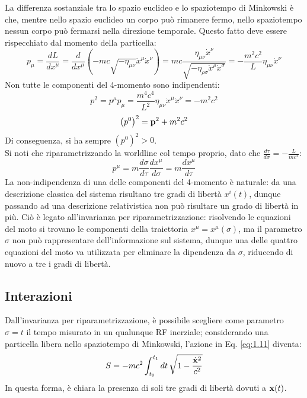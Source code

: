 La differenza sostanziale tra lo spazio euclideo e lo spaziotempo di Minkowski è che, mentre nello spazio euclideo un corpo può rimanere fermo, nello spaziotempo nessun corpo può fermarsi nella direzione temporale. Questo fatto deve essere rispecchiato dal momento della particella:
\begin{equation}
  p_{\mu} = \frac{dL}{dx^{\mu}} = \frac{d}{dx^{\mu}} \left( -mc \sqrt{- \eta_{\mu \nu}} \dot{x}^{\mu} \dot{x}^{\nu} \right) = mc \frac{\eta_{\mu \nu} \dot{x}^{\nu}}{\sqrt{- \eta_{\rho \sigma} \dot{x}^{\rho} \dot{x}^{\sigma} }} = - \frac{m^2 c^2}{L} \eta_{\mu \nu} \dot{x}^{\nu}
  \label{eq:1.20}
\end{equation}
Non tutte le componenti del 4-momento sono indipendenti:
\begin{equation}
  p^2 = p^{\mu} p_{\mu} = \frac{m^4 c^4}{L^2} \eta_{\mu \nu} \dot{x}^{\mu} \dot{x}^{\nu} = -m^2 c^2
  \label{eq:1.21}
\end{equation}
\begin{equation}
  \left( p^0 \right)^2 = \mathbf{p}^2 + m^2 c^2
  \label{eq:1.22}
\end{equation}
Di conseguenza, si ha sempre $ \left( p^0 \right)^2 > 0 $.\\
Si noti che riparametrizzando la worldline col tempo proprio, dato che $ \frac{d\tau}{d\sigma} = - \frac{L}{mc^2} $:
\begin{equation}
  p^{\mu} = m \frac{d\sigma}{d\tau} \frac{dx^{\mu}}{d\sigma} = m \frac{dx^{\mu}}{d\tau}
  \label{eq:1.23}
\end{equation}
La non-indipendenza di una delle componenti del 4-momento è naturale: da una descrizione classica del sistema risultano tre gradi di libertà $ x^i (t) $, dunque passando ad una descrizione relativistica non può risultare un grado di libertà in più. Ciò è legato all'invarianza per riparametrizzazione: risolvendo le equazioni del moto si trovano le componenti della traiettoria $ x^{\mu} = x^{\mu} (\sigma) $, ma il parametro $ \sigma $ non può rappresentare dell'informazione sul sistema, dunque una delle quattro equazioni del moto va utilizzata per eliminare la dipendenza da $ \sigma $, riducendo di nuovo a tre i gradi di libertà.

\subsection{Interazioni}

Dall'invarianza per riparametrizzazione, è possibile scegliere come parametro $ \sigma = t $ il tempo misurato in un qualunque RF inerziale; considerando una particella libera nello spaziotempo di Minkowski, l'azione in Eq. \ref{eq:1.11} diventa:
\begin{equation}
  S = -mc^2 \int_{t_0}^{t_1} dt\,\sqrt{1 - \frac{\dot{\mathbf{x}}^2}{c^2}}
  \label{eq:1.24}
\end{equation}
In questa forma, è chiara la presenza di soli tre gradi di libertà dovuti a $ \mathbf{x}(t) $.


